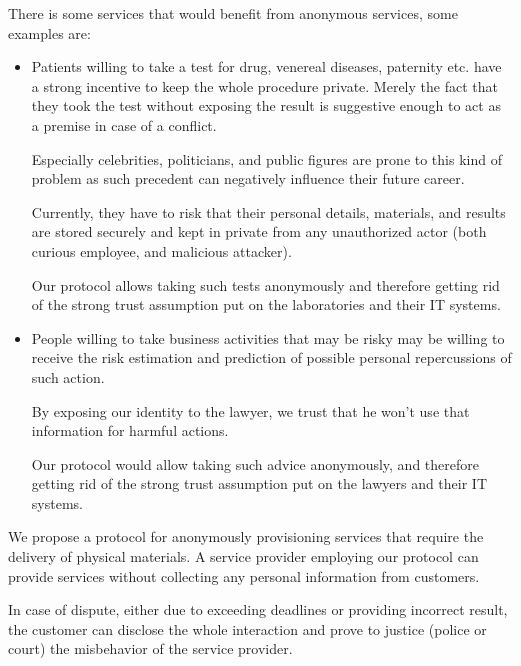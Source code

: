 \documentclass{ieeeaccess}
\begin{document}
There is some services that would benefit from anonymous services, some examples are:
\begin{itemize}
    \item Patients willing to take a 
    test for drug, venereal diseases, paternity etc. have a strong incentive to keep the whole procedure private. Merely the fact that they took the test without exposing the result is suggestive enough to act as a premise in case of a conflict.

Especially celebrities, politicians, and public figures are prone to this kind of problem as such precedent can negatively influence their future career.

Currently, they have to risk that their personal details, materials, and results are stored securely and kept in private from any unauthorized actor (both curious employee, and malicious attacker).

Our protocol allows taking such tests anonymously and therefore getting
rid of the strong trust assumption put on the laboratories and their IT
systems.
\item People willing to take business activities that may be risky %
may be willing to receive the risk estimation and prediction of possible personal repercussions of such action.

By exposing our identity to the lawyer, we trust that he won't use that
information for harmful actions.

Our protocol would allow taking such advice anonymously, and therefore
getting rid of the strong trust assumption put on the lawyers and their IT systems.
\end{itemize}

We propose a protocol for anonymously provisioning services that require the delivery of physical materials. A service provider employing our protocol can provide services without collecting any personal information from customers.

In case of dispute, either due to exceeding deadlines or providing
incorrect result, the customer can disclose the whole interaction and
prove to justice (police or court) the misbehavior of the service 
provider.
\end{document}

